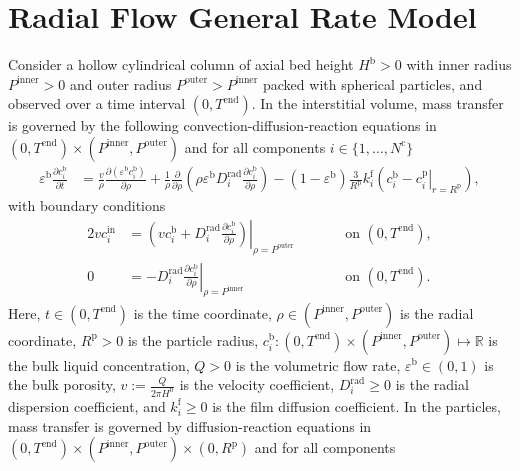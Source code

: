 \documentclass{article}
\begin{document}
\section*{Radial Flow General Rate Model}
Consider a hollow cylindrical column of axial bed height $H^{\mathrm{b}} > 0$ with inner radius $P^{\mathrm{inner}} > 0$ and outer radius $P^{\mathrm{outer}} > P^{\mathrm{inner}}$ packed with spherical particles, and observed over a time interval $(0, T^{\mathrm{end}})$.
In the interstitial volume, mass transfer is governed by the following convection-diffusion-reaction equations in $(0, T^{\mathrm{end}})\times (P^{\mathrm{inner}}, P^{\mathrm{outer}})$ and for all components $i\in\{1, \dots, N^{\mathrm{c}} \}$
\begin{align}
    \varepsilon^{\mathrm{b}} \frac{\partial c^{\mathrm{b}}_{i}}{\partial t}
    &= \frac{v}{\rho} \frac{\partial \left( \varepsilon^{\mathrm{b}} c^{\mathrm{b}}_{i} \right)}{\partial \rho}
        + \frac{1}{\rho} \frac{\partial}{\partial \rho} \left( \rho \varepsilon^{\mathrm{b}} D^{\mathrm{rad}}_{i} \frac{\partial c^{\mathrm{b}}_{i}}{\partial \rho} \right)
        - \left(1 - \varepsilon^{\mathrm{b}} \right) \frac{3}{R^{\mathrm{p}}} k^{\mathrm{f}}_{i} \left(c^{\mathrm{b}}_{i} - \left. c^{\mathrm{p}}_{i} \right|_{r = R^{\mathrm{p}}} \right),
\end{align}
with boundary conditions
\begin{alignat}{2}
    v c^{\mathrm{in}}_{i}
    &= \left.\left( v c^{\mathrm{b}}_{i} + D^{\mathrm{rad}}_{i} \frac{\partial c^{\mathrm{b}}_{i}}{\partial \rho}\right)\right|_{\rho=P^{\mathrm{outer}}}
    & & \qquad\text{on }(0, T^{\mathrm{end}}),
    \\
    0
    &= - D^{\mathrm{rad}}_{i} \left. \frac{\partial c^{\mathrm{b}}_{i}}{\partial \rho} \right|_{\rho=P^{\mathrm{inner}}}
    & & \qquad\text{on }(0, T^{\mathrm{end}}).
\end{alignat}
Here, $t\in (0, T^{\mathrm{end}})$ is the time coordinate, $\rho\in (P^{\mathrm{inner}}, P^{\mathrm{outer}})$ is the radial coordinate, $R^{\mathrm{p}}> 0$ is the particle radius, $c^{\mathrm{b}}_{i}\colon (0, T^{\mathrm{end}})\times (P^{\mathrm{inner}}, P^{\mathrm{outer}}) \mapsto \mathbb{R}$ is the bulk liquid concentration, $Q> 0$ is the volumetric flow rate, $\varepsilon^{\mathrm{b}}\in (0, 1)$ is the bulk porosity, $v:= \frac{Q}{2 \pi H^{\mathrm{b}}}$ is the velocity coefficient, $D^{\mathrm{rad}}_{i}\geq 0$ is the radial dispersion coefficient, and $k^{\mathrm{f}}_{i}\geq 0$ is the film diffusion coefficient.
In the particles, mass transfer is governed by diffusion-reaction equations in $(0, T^{\mathrm{end}}) \times (P^{\mathrm{inner}}, P^{\mathrm{outer}})\times (0, R^{\mathrm{p}})$ and for all components
\end{document}
